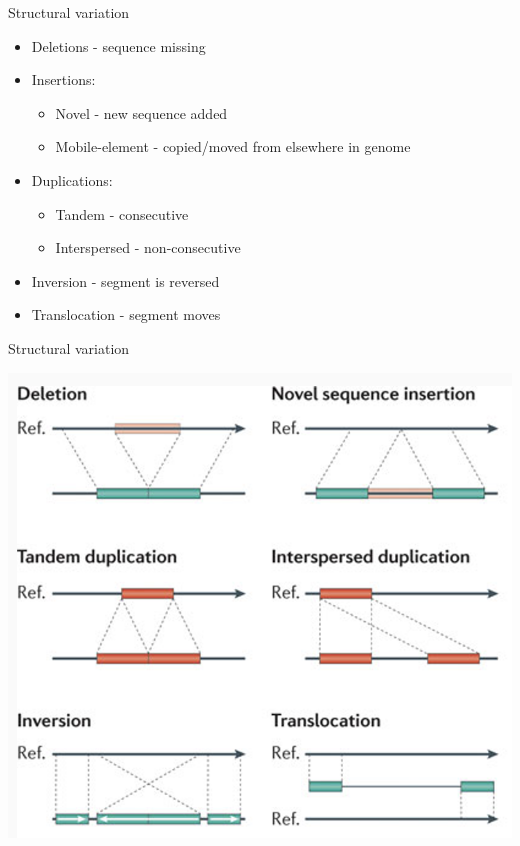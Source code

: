 \documentclass[
  ignorenonframetext,
]{beamer}
\providecommand{\tightlist}{%
  \setlength{\itemsep}{0pt}\setlength{\parskip}{0pt}}
\begin{document}
\begin{frame}{Structural variation}
\label{structural-variation}
\Large

\begin{itemize}
\tightlist
\item
  Deletions - sequence missing
\item
  Insertions:

  \begin{itemize}
  \tightlist
  \item
    Novel - new sequence added
  \item
    Mobile-element - copied/moved from elsewhere in genome
  \end{itemize}
\item
  Duplications:

  \begin{itemize}
  \tightlist
  \item
    Tandem - consecutive
  \item
    Interspersed - non-consecutive
  \end{itemize}
\item
  Inversion - segment is reversed
\item
  Translocation - segment moves
\end{itemize}
\end{frame}

\begin{frame}{Structural variation}
\label{structural-variation-1}
\center

\includegraphics[width=\textwidth,height=0.8\textheight]{figs/struc_vars.png}
\end{frame}
\end{document}

